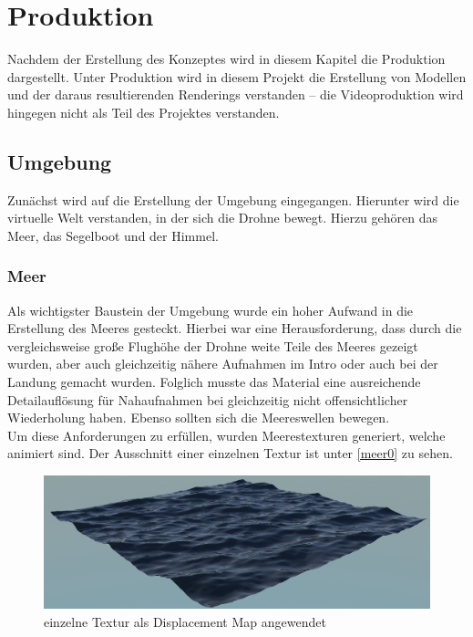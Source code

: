 \chapter{Produktion}
Nachdem der Erstellung des Konzeptes wird in diesem Kapitel die Produktion dargestellt. Unter Produktion wird in diesem Projekt die Erstellung von Modellen und der daraus resultierenden Renderings verstanden -- die Videoproduktion wird hingegen nicht als Teil des Projektes verstanden.

\section{Umgebung}

Zunächst wird auf die Erstellung der Umgebung eingegangen. Hierunter wird die virtuelle Welt verstanden, in der sich die Drohne bewegt. Hierzu gehören das Meer, das Segelboot und der Himmel.

\subsection{Meer}

Als wichtigster Baustein der Umgebung wurde ein hoher Aufwand in die Erstellung des Meeres gesteckt. Hierbei war eine Herausforderung, dass durch die vergleichsweise große Flughöhe der Drohne weite Teile des Meeres gezeigt wurden, aber auch gleichzeitig nähere Aufnahmen im Intro oder auch bei der Landung gemacht wurden. Folglich musste das Material eine ausreichende Detailauflösung für Nahaufnahmen bei gleichzeitig nicht offensichtlicher Wiederholung haben. Ebenso sollten sich die Meereswellen bewegen.\\
Um diese Anforderungen zu erfüllen, wurden Meerestexturen generiert, welche animiert sind. Der Ausschnitt einer einzelnen Textur ist unter \autoref{meer0} zu sehen. 

\begin{figure}[H]
\includegraphics[width=\textwidth]{gfx/prod/ocean/meer0.jpg}
\caption{einzelne Textur als Displacement Map angewendet}
\label{meer0}
\end{figure}

